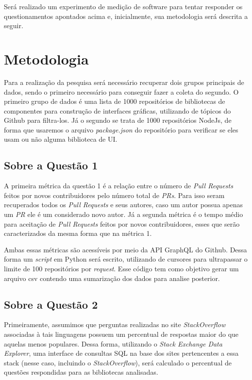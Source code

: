 \documentclass[12pt]{article}
\begin{document}
Será realizado um experimento de medição de software para tentar responder os questionamentos apontados acima e, inicialmente, sua metodologia será descrita a seguir.

\section{Metodologia}

Para a realização da pesquisa será necessário recuperar dois grupos principais de dados, sendo o primeiro necessário para conseguir fazer a coleta do segundo. O primeiro grupo de dados é uma lista de 1000 repositórios de bibliotecas de componentes para construção de interfaces gráficas, utilizando de tópicos do Github para filtra-los. Já o segundo se trata de 1000 repositórios NodeJs, de forma que usaremos o arquivo \textit{package.json} do repositório para verificar se eles usam ou não alguma biblioteca de UI.

\subsection{Sobre a Questão 1}

A primeira métrica da questão 1 é a relação entre o número de \textit{Pull Requests} feitos por novos contribuidores pelo número total de \textit{PRs}. Para isso seram recuperados todos os \textit{Pull Requests} e seus autores, caso um autor possua apenas um \textit{PR} ele é um considerado novo autor. Já a segunda métrica é o tempo médio para aceitação de \textit{Pull Requests} feitos por novos contribuidores, esses que serão caracterizados da mesma forma que na métrica 1.

Ambas essas métricas são acessíveis por meio da API GraphQL do Github. Dessa forma um \textit{script} em Python será escrito, utilizando de cursores para ultrapassar o limite de 100 repositórios por \textit{request}. Esse código tem como objetivo gerar um arquivo csv contendo uma sumarização dos dados para analise posterior. 

\subsection{Sobre a Questão 2}

Primeiramente, assumimos que perguntas realizadas no site \textit{StackOverflow} associadas à tais linguagens possuem um percentual de respostas maior do que aquelas menos populares. Dessa forma, utilizando o \textit{Stack Exchange Data Explorer}, uma interface de consultas SQL na base dos sites pertencentes a essa stack (nesse caso, incluindo o \textit{StackOverflow}), será calculado o percentual de questões respondidas para as bibliotecas analisadas. 
\end{document}
